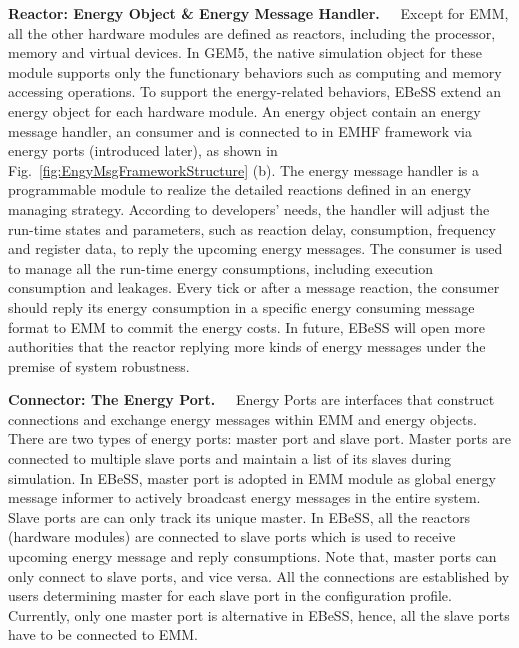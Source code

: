 \textbf{Reactor: Energy Object \& Energy Message Handler.\ \ }
Except for EMM, all the other hardware modules are defined as reactors, including the processor, memory and virtual devices.
In GEM5, the native simulation object for these module supports only the functionary behaviors such as computing and memory accessing operations.
To support the energy-related behaviors, EBeSS extend an energy object for each hardware module.
An energy object contain an energy message handler, an consumer and is connected to in EMHF framework via energy ports (introduced later), as shown in Fig.~\ref{fig:EngyMsgFrameworkStructure} (b). 
The energy message handler is a programmable module to realize the detailed reactions defined in an energy managing strategy.
According to developers' needs, the handler will adjust the run-time states and parameters, such as reaction delay, consumption, frequency and register data, to reply the upcoming energy messages.
The consumer is used to manage all the run-time energy consumptions, including execution consumption and leakages.
Every tick or after a message reaction, the consumer should reply its energy consumption in a specific energy consuming message format to EMM to commit the energy costs.
In future, EBeSS will open more authorities that the reactor replying more kinds of energy messages under the premise of system robustness.

\textbf{Connector: The Energy Port.\ \ }
Energy Ports are interfaces that construct connections and exchange energy messages within EMM and energy objects. 
There are two types of energy ports: master port and slave port.
Master ports are connected to multiple slave ports and maintain a list of its slaves during simulation.
In EBeSS, master port is adopted in EMM module as global energy message informer to actively broadcast energy messages in the entire system.
Slave ports are can only track its unique master.
In EBeSS, all the reactors (hardware modules) are connected to slave ports which is used to receive upcoming energy message and reply consumptions.
Note that, master ports can only connect to slave ports, and vice versa.
All the connections are established by users determining master for each slave port in the configuration profile. 
Currently, only one master port is alternative in EBeSS, hence, all the slave ports have to be connected to EMM.

